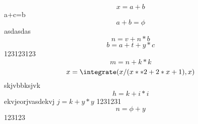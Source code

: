 $$x=a+b$$ a+c=b $$a+b=\phi$$asdasdas
$$n=v+n*b$$
\begin{equation}b=a+t+y*c\end{equation} 123123123
\begin{equation}
m=n+k*k
\end{equation}
$$x=\integrate(x/(x**2+2*x+1), x)$$
skjvbbksjvk $$h=k+i*i$$ ekvjeorjvasdekvj
$j=k+y*y$
1231231$$n=\phi+y$$123123